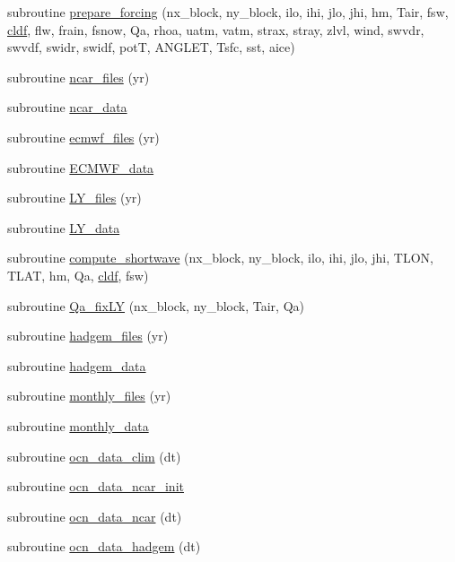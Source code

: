 \begin{DoxyCompactItemize}
subroutine \hyperlink{namespaceice__forcing_af5f411a97331efb9556841318e740684}{prepare\_\-forcing} (nx\_\-block, ny\_\-block, ilo, ihi, jlo, jhi, hm, Tair, fsw, \hyperlink{namespaceice__forcing_a251b0646126ab48de9758116bec0c414}{cldf}, flw, frain, fsnow, Qa, rhoa, uatm, vatm, strax, stray, zlvl, wind, swvdr, swvdf, swidr, swidf, potT, ANGLET, Tsfc, sst, aice)
\item 
subroutine \hyperlink{namespaceice__forcing_a18335b8937585695c3ddddd162b39414}{ncar\_\-files} (yr)
\item 
subroutine \hyperlink{namespaceice__forcing_a24793c87569906af2dce6abb1be1f204}{ncar\_\-data}
\item 
subroutine \hyperlink{namespaceice__forcing_adbed1e81d23690718cc666b6bb1c964e}{ecmwf\_\-files} (yr)
\item 
subroutine \hyperlink{namespaceice__forcing_a7d343f266bce5c9e7a7062d07fc3b57e}{ECMWF\_\-data}
\item 
subroutine \hyperlink{namespaceice__forcing_a4efb2f31dda4004f4fefadeac72d74a5}{LY\_\-files} (yr)
\item 
subroutine \hyperlink{namespaceice__forcing_af090b8a3141de745a9f1893256289b0b}{LY\_\-data}
\item 
subroutine \hyperlink{namespaceice__forcing_af98a1525343c579e040a9dfd3493ada4}{compute\_\-shortwave} (nx\_\-block, ny\_\-block, ilo, ihi, jlo, jhi, TLON, TLAT, hm, Qa, \hyperlink{namespaceice__forcing_a251b0646126ab48de9758116bec0c414}{cldf}, fsw)
\item 
subroutine \hyperlink{namespaceice__forcing_a72e60597f70954128768b0082b1a4579}{Qa\_\-fixLY} (nx\_\-block, ny\_\-block, Tair, Qa)
\item 
subroutine \hyperlink{namespaceice__forcing_a47009d309c3885ec335b6595792ffb39}{hadgem\_\-files} (yr)
\item 
subroutine \hyperlink{namespaceice__forcing_a39483ffb7ca71d3bc78cfb98b9dbbdbc}{hadgem\_\-data}
\item 
subroutine \hyperlink{namespaceice__forcing_a7a1e37c4eee269322492ab28f1e99737}{monthly\_\-files} (yr)
\item 
subroutine \hyperlink{namespaceice__forcing_aa45c8ecbe140ec4fa53e278301462374}{monthly\_\-data}
\item 
subroutine \hyperlink{namespaceice__forcing_a83eb2b44b9507b6136d8ca5969356058}{ocn\_\-data\_\-clim} (dt)
\item 
subroutine \hyperlink{namespaceice__forcing_aeb55eba5600676c3b7eb42cf02d337c1}{ocn\_\-data\_\-ncar\_\-init}
\item 
subroutine \hyperlink{namespaceice__forcing_a1b5cad2ae77729861f402fa1ef5a2140}{ocn\_\-data\_\-ncar} (dt)
\item 
subroutine \hyperlink{namespaceice__forcing_a6b38f04cff511ea4f70d58e89dfaf0e5}{ocn\_\-data\_\-hadgem} (dt)
\end{DoxyCompactItemize}
